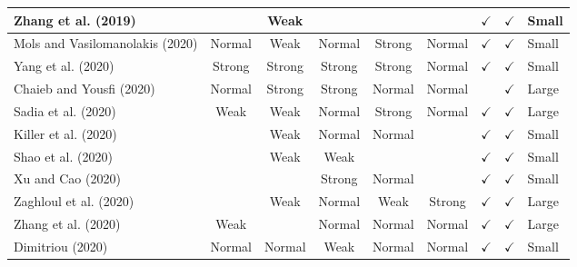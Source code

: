 \documentclass[../access.tex]{subfiles}
\begin{document}
\begin{table}[htbp]
\begin{adjustwidth}{-2cm}{}
\begin{tabular}{m{4.4cm} c c c c c c c >{\centering\arraybackslash}m{0.7cm}}
                    \hline
                    \footnotesize{Zhang et al. (2019) \cite{Zhang2019a}} & {} & {Weak} & {} & {} & {} & $ \checkmark $ & $ \checkmark $ & \footnotesize{Small} \\
                    \hline
                    \footnotesize{Mols and Vasilomanolakis (2020) \cite{Mols2020}} & {Normal} & {Weak} & {Normal} & {Strong} & {Normal} & $ \checkmark $ & $ \checkmark $ & \footnotesize{Small} \\
                    \hline
                    \footnotesize{Yang et al. (2020) \cite{Yang2020}} & {Strong} & {Strong} & {Strong} & {Strong} & {Normal} & $ \checkmark $ & $ \checkmark $ & \footnotesize{Small} \\
                    \hline
                    \footnotesize{Chaieb and Yousfi (2020) \cite{Chaieb2020}} & {Normal} & {Strong} & {Strong} & {Normal} & {Normal} & {} & $ \checkmark $ & \footnotesize{Large} \\
                    \hline
                    \footnotesize{Sadia et al. (2020) \cite{Sadia2020}} & {Weak} & {Weak} & {Normal} & {Strong} & {Normal} & $ \checkmark $ & $ \checkmark $ & \footnotesize{Large} \\
                    \hline
                    \footnotesize{Killer et al. (2020) \cite{Killer2020}} & {} & {Weak} & {Normal} & {Normal} & {} & $ \checkmark $ & $ \checkmark $ & \footnotesize{Small} \\
                    \hline
                    \footnotesize{Shao et al. (2020) \cite{Shao2020}} & {} & {Weak} & {Weak} & {} & {} & $ \checkmark $ & $ \checkmark $ & \footnotesize{Small} \\
                    \hline
                    \footnotesize{Xu and Cao (2020) \cite{Xu2020}} & {} & {} & {Strong} & {Normal} & {} & $ \checkmark $ & $ \checkmark $ & \footnotesize{Small} \\
                    \hline
                    \footnotesize{Zaghloul et al. (2020) \cite{Zaghloul2020}} & {} & {Weak} & {Normal} & {Weak} & {Strong} & $ \checkmark $ & $ \checkmark $ & \footnotesize{Large} \\
                    \hline
                    \footnotesize{Zhang et al. (2020) \cite{Zhang2020}} & {Weak} & {} & {Normal} & {Normal} & {Normal} & $ \checkmark $ & $ \checkmark $ & \footnotesize{Large} \\
                    \hline
                    \footnotesize{Dimitriou (2020) \cite{Dimitriou2020}} & {Normal} & {Normal} & {Weak} & {Normal} & {Normal} & $ \checkmark $ & $ \checkmark $ & \footnotesize{Small} \\

\end{tabular}
\end{adjustwidth}
\end{table}
\end{document}
